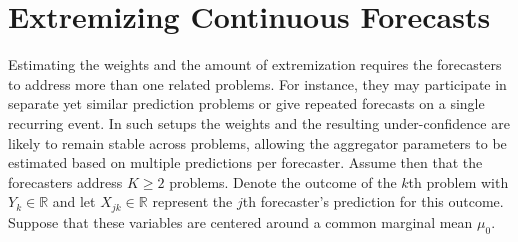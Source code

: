 \documentclass[11pt]{article}
\theoremstyle{definition}
\theoremstyle{definition}
\begin{document}
\section{Extremizing Continuous Forecasts} \label{extremization}




Estimating the weights and the amount of extremization requires the forecasters to address more than one related problems. For instance, they may participate in separate yet similar prediction problems or give repeated forecasts on a single recurring event. In such setups the weights and the resulting under-confidence are likely to remain stable across problems, allowing the aggregator parameters to be estimated based on multiple predictions per forecaster. Assume then  that the forecasters address $K \geq 2$ problems. Denote the outcome of the $k$th problem with $Y_k \in \mathbb{R}$ and let $X_{jk} \in \mathbb{R}$ represent the $j$th forecaster's prediction for this outcome. Suppose that these variables are centered around a common marginal mean $\mu_0$.  


\end{document}
